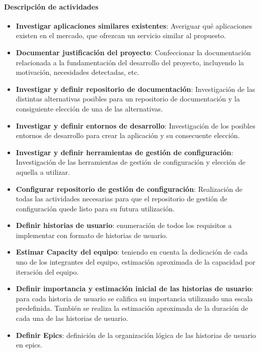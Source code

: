 \paragraph{Descripción de actividades}

\begin{itemize}
    \item{\textbf{Investigar aplicaciones similares existentes}:}
    Averiguar qué aplicaciones existen en el mercado, que ofrezcan un servicio similar al propuesto.
    \item{\textbf{Documentar justificación del proyecto}:}
    Confeccionar la documentación relacionada a la fundamentación del desarrollo del proyecto, incluyendo la motivación, necesidades detectadas, etc.
    \item{\textbf{Investigar y definir repositorio de documentación}:}
    Investigación de las distintas alternativas posibles para un repositorio de documentación y la consiguiente elección de una de las alternativas.
    \item{\textbf{Investigar y definir entornos de desarrollo}:}
    Investigación de los posibles entornos de desarrollo para crear la aplicación y su consecuente elección.
    \item{\textbf{Investigar y definir herramientas de gestión de configuración}:}
    Investigación de las herramientas de gestión de configuración y elección de aquella a utilizar.
    \item{\textbf{Configurar repositorio de gestión de configuración}:}
    Realización de todas las actividades necesarias para que el repositorio de gestión de configuración quede listo para su futura utilización. 
    \item{\textbf{Definir historias de usuario}:} 
    enumeración de todos los requisitos a implementar con formato de historias de usuario.
    \item{\textbf{Estimar Capacity del equipo}:}
    teniendo en cuenta la dedicación de cada uno de los integrantes del equipo, estimación aproximada de la capacidad por iteración del equipo.
    \item{\textbf{Definir importancia y estimación inicial de las historias de usuario}:}
    para cada historia de usuario se califica su importancia utilizando una escala predefinida. 
    También se realiza la estimación aproximada de la duración de cada una de las historias de usuario.
    \item{\textbf{Definir Epics}:}
    definición de la organización lógica de las historias de usuario en epics.

\end{itemize}

